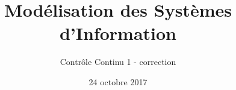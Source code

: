 \title{
   Modélisation des Systèmes d'Information
}
\author{
	Contrôle Continu 1 - correction
}
\date{24 octobre 2017}

